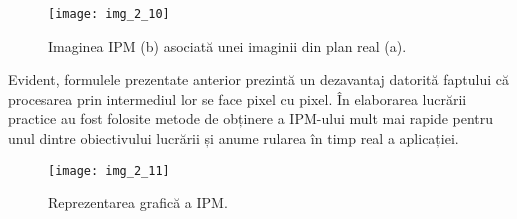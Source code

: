 \begin{figure}[!h]
	\centering
	\texttt{[image: img\_2\_10]}
	\caption[Imagine IPM]{Imaginea IPM (b) asociată unei imaginii din plan real (a).}
	\label{fig:nonfloat}
\end{figure}

Evident, formulele prezentate anterior prezintă un dezavantaj datorită faptului că procesarea prin intermediul lor se face pixel cu pixel. În elaborarea lucrării practice au fost folosite metode de obținere a IPM-ului mult mai rapide pentru unul dintre obiectivului lucrării și anume rularea în timp real a aplicației.

\begin{figure}[!h]
	\centering
	\texttt{[image: img\_2\_11]}
	\caption{Reprezentarea grafică a IPM.}
	\label{fig:nonfloat}
\end{figure}